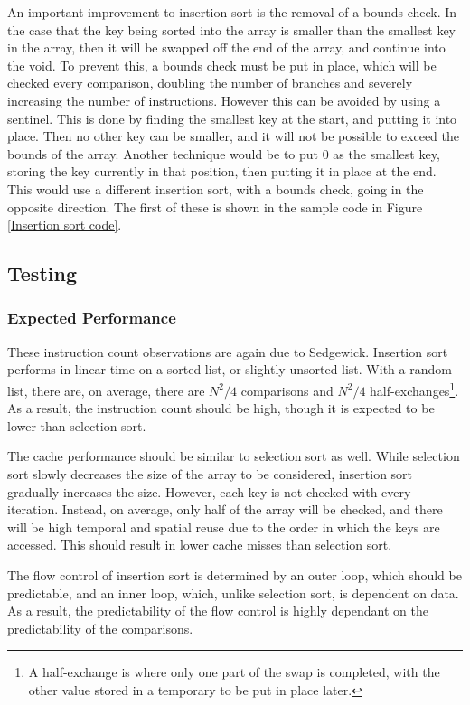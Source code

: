 An important improvement to insertion sort is the removal of a bounds check. In
the case that the key being sorted into the array is smaller than the smallest
key in the array, then it will be swapped off the end of the array, and continue
into the void. To prevent this, a bounds check must be put in place, which will
be checked every comparison, doubling the number of branches and severely
increasing the number of instructions. However this can be avoided by using a
sentinel. This is done by finding the smallest key at the start, and putting it
into place. Then no other key can be smaller, and it will not be possible to
exceed the bounds of the array. Another technique would be to put $0$ as the
smallest key, storing the key currently in that position, then putting it in
place at the end. This would use a different insertion sort, with a bounds
check, going in the opposite direction. The first of these is shown in the
sample code in Figure \vref{Insertion sort code}.

\subsection{Testing}
\subsubsection{Expected Performance}
These instruction count observations are again due to Sedgewick.  Insertion sort
performs in linear time on a sorted list, or slightly unsorted list. With a
random list, there are, on average, there are $N^2/4$ comparisons and $N^2/4$
half-exchanges\footnote{A half-exchange is where only one part of the swap is
completed, with the other value stored in a temporary to be put in place later.}.
As a result, the instruction count should be high, though it is expected to be
lower than selection sort.

The cache performance should be similar to selection sort as well. While
selection sort slowly decreases the size of the array to be considered,
insertion sort gradually increases the size. However, each key is not checked
with every iteration. Instead, on average, only half of the array will be
checked, and there will be high temporal and spatial reuse due to the order in
which the keys are accessed. This should result in lower cache misses than
selection sort.

The flow control of insertion sort is determined by an outer loop, which should
be predictable, and an inner loop, which, unlike selection sort, is dependent on
data. As a result, the predictability of the flow control is highly dependant on
the predictability of the comparisons.

